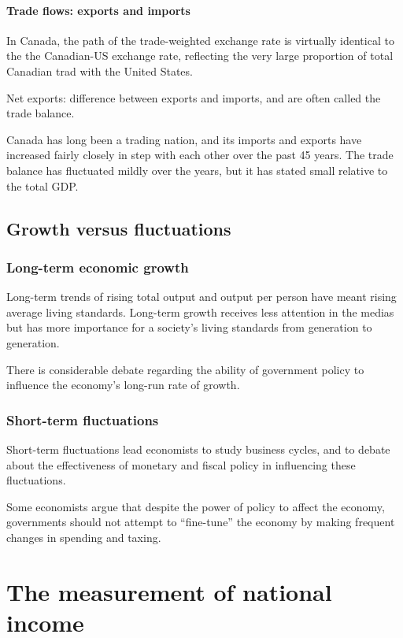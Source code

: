 \documentclass[10pt, twocolumn]{article}
\begin{document}
\paragraph{Trade flows: exports and imports}
In Canada, the path of the trade-weighted exchange rate is virtually identical to the the Canadian-US exchange rate, reflecting the very large proportion of total Canadian trad with the United States.

\begin{olddescription}
  \item[Net exports:] difference between exports and imports, and are often called the trade balance.
\end{olddescription}

Canada has long been a trading nation, and its imports and exports have increased fairly closely in step with each other over the past 45 years.
The trade balance has fluctuated mildly over the years, but it has stated small relative to the total GDP.


\subsection{Growth versus fluctuations}
\subsubsection{Long-term economic growth}
Long-term trends of rising total output and output per person have meant rising average living standards.
Long-term growth receives less attention in the medias but has more importance for a society's living standards from generation to generation.

There is considerable debate regarding the ability of government policy to influence the economy's long-run rate of growth.

\subsubsection{Short-term fluctuations}
Short-term fluctuations lead economists to study business cycles, and to debate about the effectiveness of monetary and fiscal policy in influencing these fluctuations.

Some economists argue that despite the power of policy to affect the economy, governments should not attempt to \enquote{fine-tune} the economy by making frequent changes in spending and taxing.


\section{The measurement of national income}
\end{document}
